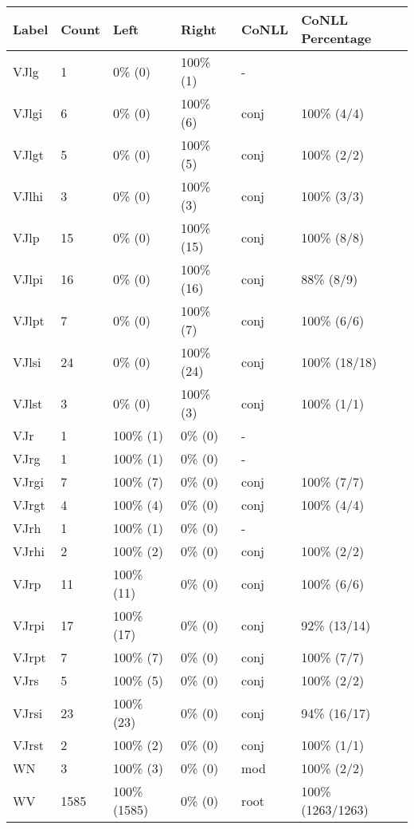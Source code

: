\begin{figure*}
\begin{tabular}{|l|l|l|l||l|l|}
\hline
Label & Count & Left & Right & CoNLL & CoNLL Percentage\\ 
\hline
 VJlg & 1 & 0\% (0) & 100\% (1) & - &  \\ 
\hline
 VJlgi & 6 & 0\% (0) & 100\% (6) & conj & 100\% (4/4) \\ 
\hline
 VJlgt & 5 & 0\% (0) & 100\% (5) & conj & 100\% (2/2) \\ 
\hline
 VJlhi & 3 & 0\% (0) & 100\% (3) & conj & 100\% (3/3) \\ 
\hline
 VJlp & 15 & 0\% (0) & 100\% (15) & conj & 100\% (8/8) \\ 
\hline
 VJlpi & 16 & 0\% (0) & 100\% (16) & conj & 88\% (8/9) \\ 
\hline
 VJlpt & 7 & 0\% (0) & 100\% (7) & conj & 100\% (6/6) \\ 
\hline
 VJlsi & 24 & 0\% (0) & 100\% (24) & conj & 100\% (18/18) \\ 
\hline
 VJlst & 3 & 0\% (0) & 100\% (3) & conj & 100\% (1/1) \\ 
\hline
 VJr & 1 & 100\% (1) & 0\% (0) & - &  \\ 
\hline
 VJrg & 1 & 100\% (1) & 0\% (0) & - &  \\ 
\hline
 VJrgi & 7 & 100\% (7) & 0\% (0) & conj & 100\% (7/7) \\ 
\hline
 VJrgt & 4 & 100\% (4) & 0\% (0) & conj & 100\% (4/4) \\ 
\hline
 VJrh & 1 & 100\% (1) & 0\% (0) & - &  \\ 
\hline
 VJrhi & 2 & 100\% (2) & 0\% (0) & conj & 100\% (2/2) \\ 
\hline
 VJrp & 11 & 100\% (11) & 0\% (0) & conj & 100\% (6/6) \\ 
\hline
 VJrpi & 17 & 100\% (17) & 0\% (0) & conj & 92\% (13/14) \\ 
\hline
 VJrpt & 7 & 100\% (7) & 0\% (0) & conj & 100\% (7/7) \\ 
\hline
 VJrs & 5 & 100\% (5) & 0\% (0) & conj & 100\% (2/2) \\ 
\hline
 VJrsi & 23 & 100\% (23) & 0\% (0) & conj & 94\% (16/17) \\ 
\hline
 VJrst & 2 & 100\% (2) & 0\% (0) & conj & 100\% (1/1) \\ 
\hline
 WN & 3 & 100\% (3) & 0\% (0) & mod & 100\% (2/2) \\ 
\hline
 WV & 1585 & 100\% (1585) & 0\% (0) & root & 100\% (1263/1263) \\ 

\end{tabular}
\end{figure*}
